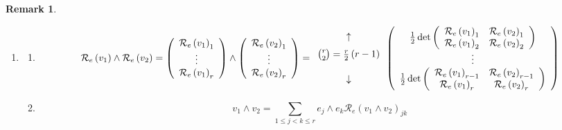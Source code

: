 \documentclass[aps,preprint]{revtex4}%
\newtheorem{remark}[theorem]{Remark}
\begin{document}
\begin{remark}
\begin{enumerate}
\item
\begin{enumerate}
\item
\begin{equation}
\mathcal{R}_{e}\left(  v_{1}\right)  \wedge\mathcal{R}_{e}\left(
v_{2}\right)  =\left(
\begin{array}
[c]{c}%
\mathcal{R}_{e}\left(  v_{1}\right)  _{1}\\
\vdots\\
\mathcal{R}_{e}\left(  v_{1}\right)  _{r}%
\end{array}
\right)  \wedge\left(
\begin{array}
[c]{c}%
\mathcal{R}_{e}\left(  v_{2}\right)  _{1}\\
\vdots\\
\mathcal{R}_{e}\left(  v_{2}\right)  _{r}%
\end{array}
\right)  =%
\begin{array}
[c]{c}%
\uparrow\\
\underset{\underset{}{}}{\overset{\overset{}{}}{\binom{r}{2}=\frac{r}%
{2}\left(  r-1\right)  }}\\
\downarrow
\end{array}
\left(
\begin{array}
[c]{c}%
\frac{1}{2}\det\left(
\begin{array}
[c]{cc}%
\mathcal{R}_{e}\left(  v_{1}\right)  _{1} & \mathcal{R}_{e}\left(
v_{2}\right)  _{1}\\
\mathcal{R}_{e}\left(  v_{1}\right)  _{2} & \mathcal{R}_{e}\left(
v_{2}\right)  _{2}%
\end{array}
\right) \\
\vdots\\
\frac{1}{2}\det\left(
\begin{array}
[c]{cc}%
\mathcal{R}_{e}\left(  v_{1}\right)  _{r-1} & \mathcal{R}_{e}\left(
v_{2}\right)  _{r-1}\\
\mathcal{R}_{e}\left(  v_{1}\right)  _{r} & \mathcal{R}_{e}\left(
v_{2}\right)  _{r}%
\end{array}
\right)
\end{array}
\right)
\end{equation}


\item
\begin{equation}
v_{1}\wedge v_{2}=\sum\limits_{1\leq j<k\leq r}e_{j}\wedge e_{k}%
\mathcal{R}_{e}\left(  v_{1}\wedge v_{2}\right)  _{jk}%
\end{equation}



\end{enumerate}
\end{enumerate}
\end{remark}
\end{document}

